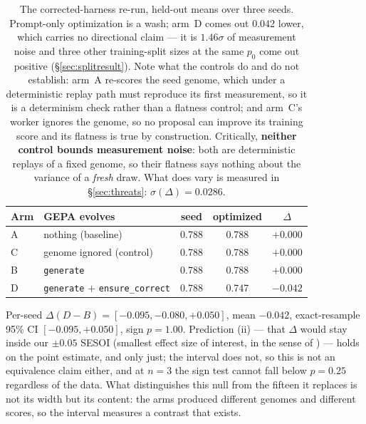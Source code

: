 \documentclass[11pt]{article}
\newcommand{\dd}{\ensuremath{\Delta}}
\begin{document}
\begin{table}[h]
\centering
\begin{tabular}{llccc}
\toprule
Arm & GEPA evolves & seed & optimized & $\Delta$ \\
\midrule
A & nothing (baseline) & 0.788 & 0.788 & $+0.000$ \\
C & genome ignored (control) & 0.788 & 0.788 & $+0.000$ \\
B & \texttt{generate} & 0.788 & 0.788 & $\mathbf{+0.000}$ \\
D & \texttt{generate} $+$ \texttt{ensure\_correct} & 0.788 & 0.747 & $\mathbf{-0.042}$ \\
\bottomrule
\end{tabular}
\caption{The corrected-harness re-run, held-out means over three seeds. Prompt-only
optimization is a wash; arm~D comes out $0.042$ lower, which carries no directional claim --- it
is $1.46\sigma$ of measurement noise and three other training-split sizes at the same $p_0$ come
out positive (\S\ref{sec:splitresult}). Note what the controls do and do not establish: arm~A re-scores the seed genome,
which under a deterministic replay path must reproduce its first measurement, so it is a
determinism check rather than a flatness control; and arm~C's worker ignores the genome, so no
proposal can improve its training score and its flatness is true by construction. Critically,
\textbf{neither control bounds measurement noise}: both are deterministic replays of a fixed
genome, so their flatness says nothing about the variance of a \emph{fresh} draw. What does vary
is measured in \S\ref{sec:threats}: $\sigma(\dd) = 0.0286$.}
\label{tab:rerun}
\end{table}

Per-seed $\dd(D-B) = [-0.095, -0.080, +0.050]$, mean $\mathbf{-0.042}$, exact-resample 95\%
CI $[-0.095, +0.050]$, sign $p=1.00$. Prediction (ii) --- that $\dd$ would stay inside our
$\pm0.05$ SESOI (smallest effect size of interest, in the sense of
\citet{lakens2018equivalence}) --- holds on the point estimate, and only just; the interval does
not, so this is not an equivalence claim either, and at $n=3$ the sign test cannot fall below
$p=0.25$ regardless of the data. What distinguishes this null from the fifteen it replaces is
not its width but its content: the arms produced different genomes and different scores, so
the interval measures a contrast that exists.
\end{document}
